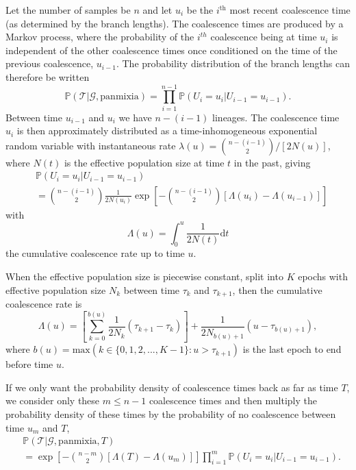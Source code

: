 \documentclass[12pt]{article}
\begin{document}
Let the number of samples be $n$ and let $u_i$ be the $i^\mathrm{th}$ most recent coalescence time (as determined by the branch lengths).
The coalescence times are produced by a Markov process, where the probability of the $i^{th}$ coalescence being at time $u_i$ is independent of the other coalescence times once conditioned on the time of the previous coalescence, $u_{i-1}$.
The probability distribution of the branch lengths can therefore be written
%
\begin{equation}
\mathbb{P}(\mathcal{T} | \mathcal{G},\mathrm{panmixia}) = \prod_{i=1}^{n-1} \mathbb{P}(U_i = u_i | U_{i-1} = u_{i-1}).
\end{equation}
%
Between time $u_{i-1}$ and $u_i$ we have $n-(i-1)$ lineages.
The coalescence time $u_i$ is then approximately distributed as a time-inhomogeneous exponential random variable with instantaneous rate $\lambda(u) = \binom{n-(i-1)}{2}/[2N(u)]$, where $N(t)$ is the effective population size at time $t$ in the past, giving
%
\begin{equation}
\begin{aligned}
& \mathbb{P}(U_i = u_i | U_{i-1} = u_{i-1})\\
& = \binom{n-(i-1)}{2}\frac{1}{2N(u_i)}\exp\left[ -\binom{n-(i-1)}{2} [\Lambda(u_i) - \Lambda(u_{i-1})] \right]
\end{aligned}
\end{equation}
%
with
%
\begin{equation}
\Lambda(u) = \int_0^u \frac{1}{2N(t)} \mathrm{d}t
\end{equation}
the cumulative coalescence rate up to time $u$.
%

When the effective population size is piecewise constant, split into $K$ epochs with effective population size $N_k$ between time $\tau_k$ and $\tau_{k+1}$, then the cumulative coalescence rate is \citep[see Appendix A of][]{stern2020disentangling}
%
\begin{equation}
\Lambda(u) = \left[ \sum_{k=0}^{b(u)} \frac{1}{2N_k} (\tau_{k+1} - \tau_k) \right] + \frac{1}{2N_{b(u)+1}} (u - \tau_{b(u)+1}),
\end{equation}
%
where $b(u) = \mathrm{max}(k \in \{0,1,2,...,K-1\} : u > \tau_{k+1} )$ is the last epoch to end before time $u$.

If we only want the probability density of coalescence times back as far as time $T$, we consider only these $m \leq n-1$ coalescence times and then multiply the probability density of these times by the probability of no coalescence between time $u_m$ and $T$,
%
\begin{equation}
\begin{aligned}
& \mathbb{P}(\mathcal{T} | \mathcal{G},\mathrm{panmixia},T)\\
& = \exp\left[ -\binom{n-m}{2} [\Lambda(T) - \Lambda(u_m)] \right] \prod_{i=1}^{m} \mathbb{P}(U_i = u_i | U_{i-1} = u_{i-1}).
\end{aligned}
\end{equation}
\end{document}
